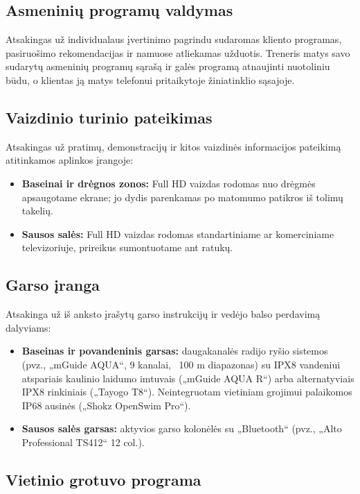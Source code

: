 \documentclass[a4paper,11pt]{article}
\begin{document}
\subsection{Asmeninių programų valdymas}

Atsakingas už individualaus įvertinimo pagrindu sudaromas kliento programas, pasiruošimo rekomendacijas ir namuose atliekamas užduotis. Treneris matys savo sudarytų asmeninių programų sąrašą ir galės programą atnaujinti nuotoliniu būdu, o klientas ją matys telefonui pritaikytoje žiniatinklio sąsajoje.

\subsection{Vaizdinio turinio pateikimas}

Atsakingas už pratimų, demonstracijų ir kitos vaizdinės informacijos pateikimą atitinkamos aplinkos įrangoje:
\begin{itemize}
    \item \textbf{Baseinai ir drėgnos zonos:} Full HD vaizdas rodomas nuo drėgmės apsaugotame ekrane; jo dydis parenkamas po matomumo patikros iš tolimų takelių.
    \item \textbf{Sausos salės:} Full HD vaizdas rodomas standartiniame ar komerciniame televizoriuje, prireikus sumontuotame ant ratukų.
\end{itemize}

\subsection{Garso įranga}

Atsakinga už iš anksto įrašytų garso instrukcijų ir vedėjo balso perdavimą dalyviams:
\begin{itemize}
    \item \textbf{Baseinas ir povandeninis garsas:} daugakanalės radijo ryšio sistemos (pvz., „mGuide AQUA“, 9 kanalai, ~100 m diapazonas) su IPX8 vandeniui atspariais kaulinio laidumo imtuvais („mGuide AQUA R“) arba alternatyviais IPX8 rinkiniais („Tayogo T8“). Neintegruotam vietiniam grojimui palaikomos IP68 ausinės („Shokz OpenSwim Pro“).
    \item \textbf{Sausos salės garsas:} aktyvios garso kolonėlės su „Bluetooth“ (pvz., „Alto Professional TS412“ 12 col.).
\end{itemize}

\subsection{Vietinio grotuvo programa}
\end{document}
